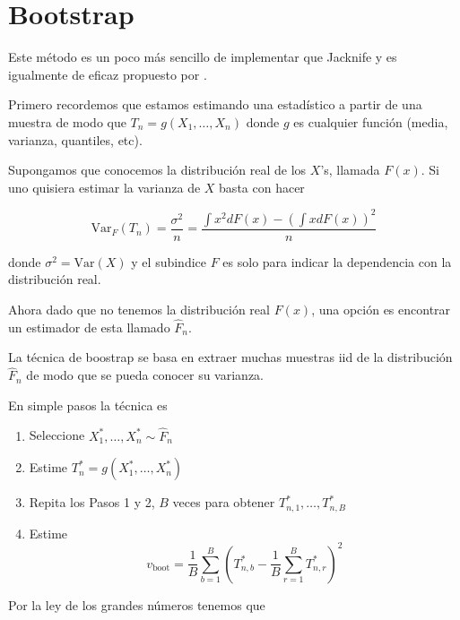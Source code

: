 \documentclass[12pt]{book}\usepackage[]{graphicx}\usepackage[]{color}
\theoremstyle{definition}
\theoremstyle{plain}
\begin{document}
\begin{laboratorio}{}{}


















\end{laboratorio}


\newpage


\section{Bootstrap}


Este método es un poco más sencillo de implementar que Jacknife y es
igualmente de eficaz propuesto por \cite{Efron1979}.

Primero recordemos que estamos estimando una estadístico a partir de
una muestra de modo que \(T_{n}=g\left( X_{1},\ldots,X_{n} \right)\)
donde \(g\) es cualquier función (media, varianza, quantiles, etc).


Supongamos que conocemos la distribución real de los \(X\)'s, llamada \(F(x)\). Si uno
quisiera estimar la varianza de \(X\) basta con hacer

\begin{equation*}
\mathrm{Var}_{F}\left(T_{n}\right)
= \frac{\sigma^{2}}{n}=\frac{\int x^{2}  dF(x)-\left(\int x
dF(x)\right)^{2}}{n}
\end{equation*}



donde \(\sigma^{2} = \mathrm{Var}\left(X\right)\) y el subindice \(F\) es solo para indicar la dependencia con la distribución real.

Ahora dado que no tenemos la distribución  real \(F(x)\), una opción es encontrar un estimador de esta llamado \(\hat{F}_n\).

La técnica de boostrap se basa en extraer muchas muestras iid de la distribución \(\hat{F}_n\) de modo que se pueda conocer su varianza.

En simple pasos la técnica es

\begin{enumerate}
    \item Seleccione \(X_{1}^{*}, \ldots, X_{n}^{*} \sim \widehat{F}_{n}\)
    \item Estime \(T_{n}^{*}=g\left(X_{1}^{*}, \ldots, X_{n}^{*}\right)\)
    \item Repita los Pasos 1 y 2, \(B\) veces para obtener \(T_{n, 1}^{*}, \ldots, T_{n, B}^{*}\)
    \item Estime
    \[
    v_{\mathrm{boot}}=\frac{1}{B} \sum_{b=1}^{B}\left(T_{n, b}^{*}-\frac{1}{B} \sum_{r=1}^{B} T_{n, r}^{*}\right)^{2}
    \]
\end{enumerate}
Por la ley de los grandes números tenemos que
\end{document}
